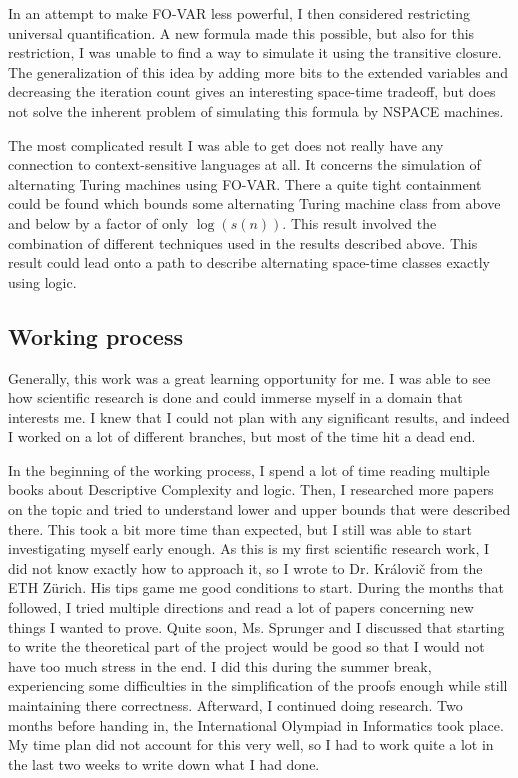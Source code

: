 In an attempt to make FO-VAR less powerful, I then considered restricting universal quantification.
A new formula made this possible, but also for this restriction, I was unable to find a way to simulate it using the transitive closure.
The generalization of this idea by adding more bits to the extended variables and decreasing the iteration count gives an interesting space-time tradeoff, but does not solve the inherent problem of simulating this formula by NSPACE machines.

The most complicated result I was able to get does not really have any connection to context-sensitive languages at all.
It concerns the simulation of alternating Turing machines using FO-VAR\@.
There a quite tight containment could be found which bounds some alternating Turing machine class from above and below by a factor of only $\log(s(n))$.
This result involved the combination of different techniques used in the results described above.
This result could lead onto a path to describe alternating space-time classes exactly using logic.

\subsection{Working process}\label{subsec:working-process}
Generally, this work was a great learning opportunity for me.
I was able to see how scientific research is done and could immerse myself in a domain that interests me.
I knew that I could not plan with any significant results, and indeed I worked on a lot of different branches, but most of the time hit a dead end.

In the beginning of the working process, I spend a lot of time reading multiple books about Descriptive Complexity and logic.
Then, I researched more papers on the topic and tried to understand lower and upper bounds that were described there.
This took a bit more time than expected, but I still was able to start investigating myself early enough.
As this is my first scientific research work, I did not know exactly how to approach it, so I wrote to Dr. Královič from the ETH Zürich.
His tips game me good conditions to start.
During the months that followed, I tried multiple directions and read a lot of papers concerning new things I wanted to prove.
Quite soon, Ms. Sprunger and I discussed that starting to write the theoretical part of the project would be good so that I would not have too much stress in the end.
I did this during the summer break, experiencing some difficulties in the simplification of the proofs enough while still maintaining there correctness.
Afterward, I continued doing research.
Two months before handing in, the International Olympiad in Informatics took place.
My time plan did not account for this very well, so I had to work quite a lot in the last two weeks to write down what I had done.

